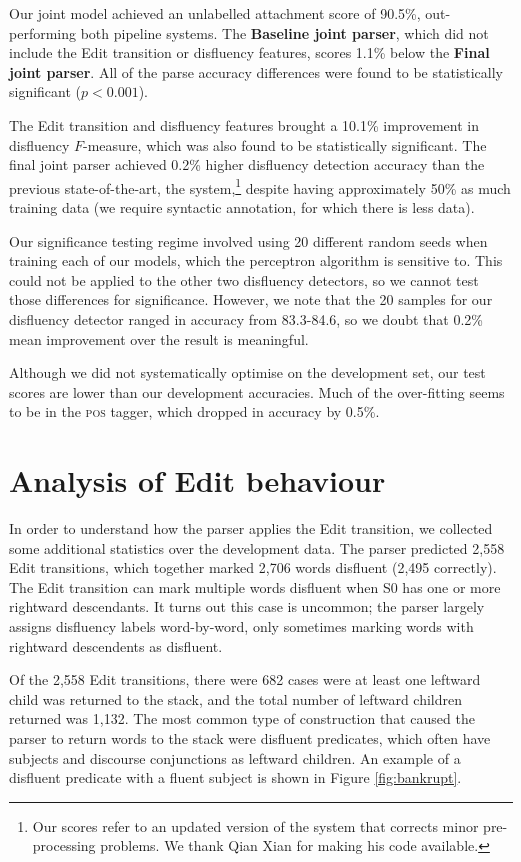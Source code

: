 \documentclass[11pt,letterpaper]{article}
\begin{document}
Our joint model achieved an unlabelled attachment score of 90.5\%, out-performing
both pipeline systems.  The \textbf{Baseline joint parser}, which did not include
the Edit transition or disfluency features, scores 1.1\% below the
\textbf{Final joint parser}.  All of the parse accuracy differences were found to
be statistically significant ($p<0.001$).

The Edit transition and disfluency features brought a 10.1\% improvement
in disfluency $F$-measure, which was also found to be statistically significant.
The final joint parser achieved 0.2\% higher disfluency detection accuracy than
the previous state-of-the-art, the \citet{qian:13} system,\footnote{
Our scores refer to an updated version of the system
that corrects minor pre-processing problems. We thank Qian Xian for making
his code available.} despite having approximately 50\%
as much training data (we require syntactic annotation, for which there is
less data).

Our significance testing regime involved using 20 different random seeds when
training each of our models, which the perceptron algorithm is sensitive to.
This could not be applied to the other two disfluency detectors, so we cannot
test those differences for significance.  However, we note that the 20 samples
for our disfluency detector ranged in accuracy from 83.3-84.6, so we doubt
that 0.2\% mean improvement over the \citet{qian:13} result is meaningful.

Although we did not systematically
optimise on the development set, our test scores are lower than our development
accuracies. Much of the over-fitting seems to be in the \textsc{pos} tagger,
which dropped in accuracy by 0.5\%.

\section{Analysis of Edit behaviour}

In order to understand how the parser applies the Edit transition, we
collected some additional statistics over the development data.
The parser predicted 2,558 Edit transitions,
which together marked 2,706
words disfluent (2,495 correctly).  The Edit transition can mark multiple words
disfluent when S0 has one or more rightward descendants. It turns out this case
is uncommon;
the parser largely assigns disfluency labels
word-by-word, only sometimes marking words with rightward descendents as disfluent.

Of the 2,558 Edit transitions, there were 682 cases were at least one leftward
child was returned to the stack, and the total number of leftward children returned
was 1,132. The most common type of construction that caused the parser to return
words to the stack
were disfluent predicates, which often have subjects and discourse conjunctions as leftward
children. An example of a disfluent predicate with a fluent subject is shown
in Figure \ref{fig:bankrupt}.
\end{document}
